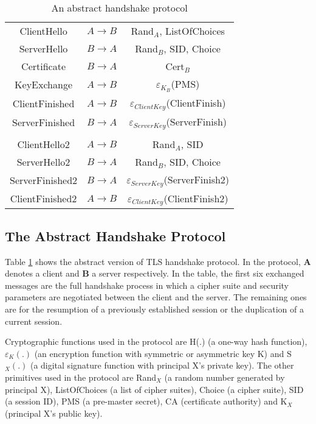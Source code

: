 \documentclass[a4paper,fleqn]{cas-dc}
\begin{document}
\begin{table}[]
\centering
    \begin{tabular}{ c c c }
    ClientHello & $A \rightarrow B$  & Rand$_A$, ListOfChoices \\ 
    ServerHello & $B \rightarrow A$ & Rand$_B$, SID, Choice \\  
    Certificate & $B \rightarrow A$ & Cert$_B$ \\ 
    KeyExchange & $A \rightarrow B$ & $\varepsilon_{K_B}$(PMS) \\ 
    ClientFinished & $A \rightarrow B$ & $\varepsilon_{ClientKey}$(ClientFinish) \\
   ServerFinished & $B \rightarrow A$ & $\varepsilon_{ServerKey}$(ServerFinish) \\
   \\
   ClientHello2 & $A \rightarrow B$  & Rand$_A$, SID \\
   ServerHello2 & $B \rightarrow A$ & Rand$_B$, SID, Choice \\
   ServerFinished2 & $B \rightarrow A$ & $\varepsilon_{ServerKey}$(ServerFinish2) \\
   ClientFinished2 & $A \rightarrow B$ & $\varepsilon_{ClientKey}$(ClientFinish2) \\
    \end{tabular}
    \caption{An abstract handshake protocol}
    \label{tab:tb2}
\end{table}

\subsection{The Abstract Handshake Protocol}\label{abstracthandshake}
Table \ref{tab:tb2} shows the abstract version of TLS handshake protocol. In the protocol, \textbf{A} denotes a client and \textbf{B} a server respectively. In the table, the first six exchanged messages are the full handshake process in which a cipher suite and security parameters are negotiated between the client and the server. The remaining ones are for the resumption of a previously established session or the duplication of a current session.

Cryptographic functions used in the protocol are H(.)
(a one-way hash function), $\varepsilon_K(.)$ (an encryption function with symmetric or asymmetric key K) and S$_X(.)$ (a digital signature function with principal X’s private key). The other primitives used in the protocol are Rand$_X$ (a random number generated by principal X), ListOfChoices (a list of cipher suites), Choice (a cipher suite), SID (a session ID), PMS (a pre-master secret), CA (certificate authority) and K$_X$ (principal X's public key).
\end{document}
